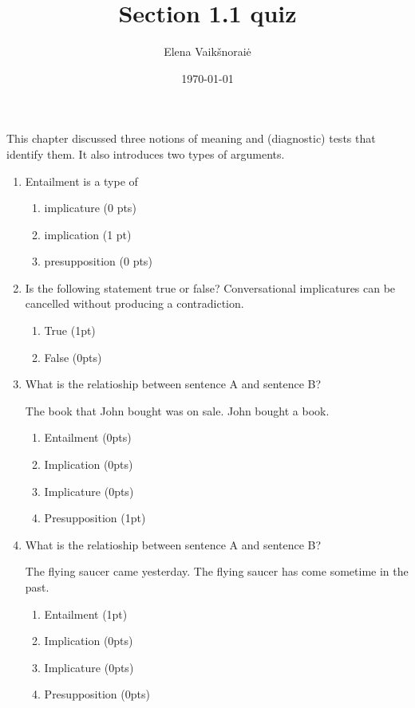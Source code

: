 \documentclass[a4]{article}
\title{Section 1.1 quiz}
\author{Elena Vaik\v snorai\.{e} }
\date{\today}
\begin{document}
\maketitle

This chapter discussed three notions of meaning and (diagnostic) tests that identify them. It also introduces two types of arguments.

\begin{enumerate}
   \item Entailment is a type of 
   \begin{enumerate}[noitemsep]
       \item implicature (0 pts)
        \item implication (1 pt)
           \item presupposition (0 pts)
   \end{enumerate}
    \item Is the following statement true or false? Conversational implicatures can be cancelled without producing a contradiction. 
   \begin{enumerate}[noitemsep]
        \item True (1pt)
        \item False (0pts)
    \end{enumerate}
 \item What is the relatioship between sentence A and sentence B?
\begin{exe}
\ex
\begin{xlist}
\ex The book that John bought was on sale.
\ex John bought a book.
\end{xlist}
\end{exe}
   \begin{enumerate}[noitemsep]
        \item Entailment (0pts)
        \item Implication (0pts)
         \item Implicature (0pts)
           \item Presupposition (1pt)
    \end{enumerate}

 \item What is the relatioship between sentence A and sentence B?
\begin{exe}
\ex
\begin{xlist}
\ex  The flying saucer came yesterday.
\ex The flying saucer has come sometime in the past.
\end{xlist}
\end{exe}
   \begin{enumerate}[noitemsep]
        \item Entailment (1pt)
        \item Implication (0pts)
         \item Implicature (0pts)
           \item Presupposition (0pts)
    \end{enumerate}



\end{enumerate}
\end{document}
